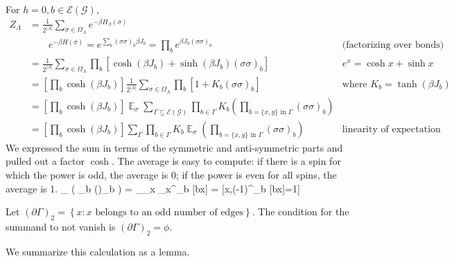\documentclass[12pt]{book}
\theoremstyle{norm}
\begin{document}
For $h=0, b\in \mathcal{E}(\mathcal{G})$,
\begin{align*}
Z_{\Lambda} &= \frac{1}{2^{|\Lambda|}} \sum_{\sigma \in \Omega_{\Lambda}} e^{-\beta H_{\Lambda}(\sigma)}\\
&\qquad e^{-\beta H(\sigma)} = e^{\sum_b (\sigma\sigma)_b \beta J_b} = \prod_b e^{\beta J_b (\sigma\sigma)_b}& \text{(factorizing over bonds)}\\
&=\frac{1}{2^{|\Lambda|}} \sum_{\sigma\in \Omega_{\Lambda}} \prod_b [\cosh(\beta J_b) + \sinh(\beta J_b)(\sigma\sigma)_b]&e^x = \cosh x + \sinh x\\
&=\left[ {\prod_b \cosh(\beta J_b)} \right] \frac{1}{2^{|\Lambda|}}\sum_{\sigma\in \Omega_{\Lambda}} \prod_b[1+K_b(\sigma\sigma)_b]&\text{where }K_b=\tanh(\beta J_b)\\
&=\left[ {\prod_b \cosh(\beta J_b)} \right] \mathop{\mathbb E}_{\sigma} \sum_{\Gamma\subseteq \mathcal{E}(\mathcal{G})}\prod_{b\in \Gamma}K_b \left( {\prod_{b=\{x,y\}\text{ in }\Gamma} (\sigma\sigma)_b} \right)\\ 
&=\left[ {\prod_b \cosh(\beta J_b)} \right] \sum_{\Gamma}\prod_{b\in \Gamma}K_b
\mathop{\mathbb E}_{\sigma} \left( {\prod_{b=\{x,y\}\text{ in }\Gamma} (\sigma\sigma)_b} \right)&\text{linearity of expectation}
\end{align*}
We expressed the sum in terms of the symmetric and anti-symmetric parts and pulled out a factor $\cosh$. 
The average is easy to compute: if there is a spin for which the power is odd, the average is 0; if the power is even for all spins, the average is 1.
\be
{}_{\sigma} \left( {\prod_{b\in \Gamma} (\sigma\sigma)_b} \right) = _{\sigma}\prod_x \sigma_x^{\sum_{b\in \Gamma}  [b\ni x]}
= [\forall x,(-1)^{\sum_{b\in \Gamma} [b\ni x]}=1]
\ee

Let $(\partial \Gamma)_2=\left\{{x}:{x\text{ belongs to an odd number of edges}}\right\}$. The condition for the summand to not vanish is $(\partial \Gamma)_2=\phi$.

We summarize this calculation as a lemma.
\end{document}
